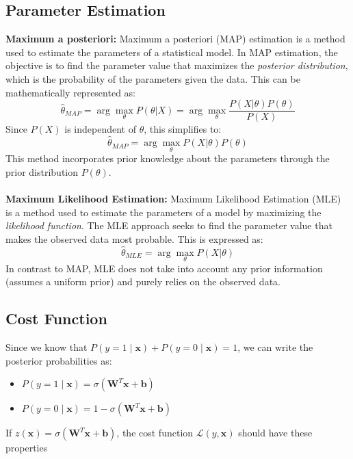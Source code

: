\documentclass{article}
\begin{document}
\subsection{Parameter Estimation}

\textbf{Maximum a posteriori:}
Maximum a posteriori (MAP) estimation is a method used to estimate the parameters of a statistical model. In MAP estimation, the objective is to find the parameter value that maximizes the \textit{posterior distribution}, which is the probability of the parameters given the data. This can be mathematically represented as:
\[
\hat{\theta}_{MAP} = \arg\max_{\theta} P(\theta|X) = \arg\max_{\theta} \frac{P(X|\theta)P(\theta)}{P(X)}
\]
Since \(P(X)\) is independent of \(\theta\), this simplifies to:
\[
\hat{\theta}_{MAP} = \arg\max_{\theta} P(X|\theta)P(\theta)
\]
This method incorporates prior knowledge about the parameters through the prior distribution \(P(\theta)\).
\\ \\
\noindent \textbf{Maximum Likelihood Estimation:}
Maximum Likelihood Estimation (MLE) is a method used to estimate the parameters of a model by maximizing the \textit{likelihood function}. The MLE approach seeks to find the parameter value that makes the observed data most probable. This is expressed as:
\[
\hat{\theta}_{MLE} = \arg\max_{\theta} P(X|\theta)
\]
In contrast to MAP, MLE does not take into account any prior information (assumes a uniform prior) and purely relies on the observed data.

\subsection{Cost Function}
Since we know that $P(y=1\mid \textbf{x}) + P(y=0\mid \textbf{x}) = 1$, we can write the posterior probabilities as:
\begin{itemize}
    \item $P(y=1\mid \textbf{x}) = \sigma(\textbf{W}^{T}\textbf{x} + \textbf{b})$
    \item $P(y=0\mid \textbf{x}) = 1-\sigma(\textbf{W}^{T}\textbf{x} + \textbf{b})$
\end{itemize}
\noindent
If $z(\textbf{x}) = \sigma(\textbf{W}^{T}\textbf{x} + \textbf{b})$, the cost function $\mathcal{L}(y,\textbf{x})$ should have these properties
\end{document}

